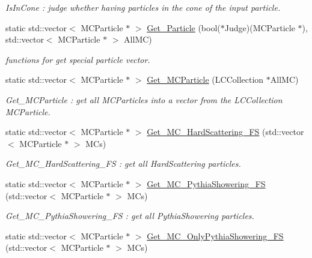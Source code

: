 \begin{DoxyCompactItemize}
\begin{DoxyCompactList}\small\item\em IsInCone : judge whether having particles in the cone of the input particle. \item\end{DoxyCompactList}\item 
static std::vector$<$ MCParticle $\ast$ $>$ \hyperlink{classToolSet_1_1CMC_ae5e3cc992d63d6efb8030bdb170b87d1}{Get\_\-Particle} (bool($\ast$Judge)(MCParticle $\ast$), std::vector$<$ MCParticle $\ast$ $>$ AllMC)
\begin{DoxyCompactList}\small\item\em functions for get special particle vector. \item\end{DoxyCompactList}\item 
static std::vector$<$ MCParticle $\ast$ $>$ \hyperlink{classToolSet_1_1CMC_aec3000cf58c5ef65b62938decced8303}{Get\_\-MCParticle} (LCCollection $\ast$AllMC)
\begin{DoxyCompactList}\small\item\em Get\_\-MCParticle : get all MCParticles into a vector from the LCCollection MCParticle. \item\end{DoxyCompactList}\item 
static std::vector$<$ MCParticle $\ast$ $>$ \hyperlink{classToolSet_1_1CMC_a899d324f086d12abb75db9d87798ed91}{Get\_\-MC\_\-HardScattering\_\-FS} (std::vector$<$ MCParticle $\ast$ $>$ MCs)
\begin{DoxyCompactList}\small\item\em Get\_\-MC\_\-HardScattering\_\-FS : get all HardScattering particles. \item\end{DoxyCompactList}\item 
static std::vector$<$ MCParticle $\ast$ $>$ \hyperlink{classToolSet_1_1CMC_a321f55fa02ad6ed18931bc906b2e19ee}{Get\_\-MC\_\-PythiaShowering\_\-FS} (std::vector$<$ MCParticle $\ast$ $>$ MCs)
\begin{DoxyCompactList}\small\item\em Get\_\-MC\_\-PythiaShowering\_\-FS : get all PythiaShowering particles. \item\end{DoxyCompactList}\item 
static std::vector$<$ MCParticle $\ast$ $>$ \hyperlink{classToolSet_1_1CMC_aea4e69e23c45ca6ac4674ee90d56fc1c}{Get\_\-MC\_\-OnlyPythiaShowering\_\-FS} (std::vector$<$ MCParticle $\ast$ $>$ MCs)

\end{DoxyCompactItemize}
